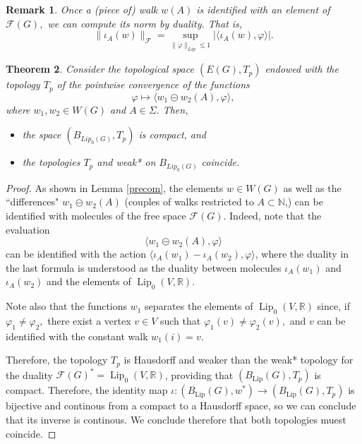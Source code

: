 \documentclass[preprint,12pt]{elsarticle}
\newtheorem{theorem}{Theorem}[section]
\newtheorem{remark}[theorem]{Remark}
\begin{document}
\begin{remark}
Once a (piece of) walk $w(A)$ is identified with an element of $\mathcal F(G),$ we can compute its norm by duality. That is, 
$$
\|\iota_A(w)\|_{\mathcal F} = \sup_{\|\varphi\|_{Lip}\le 1 } | \langle \iota_A(w), \varphi \rangle |.
$$
\end{remark}

\vspace{0.3cm}



\begin{theorem} \label{compact}
Consider the topological space $(E(G), T_p)$ endowed with the topology $T_p$ of the pointwise convergence of the functions
$$
\varphi \mapsto \langle w_1 \circleddash w_2(A), \varphi \rangle,
$$
where $w_1, w_2 \in W(G)$ and $A \in \Sigma.$ Then,
\begin{itemize}
\item[(i)] the space
 $(B_{Lip_0(G)}, T_p)$ is compact, and
\item[(ii)] the topologies
 $T_p$ and  weak* on $B_{Lip_0(G)}$ coincide.
\end{itemize}
\end{theorem}
\begin{proof}
As shown in Lemma \ref{precom}, the elements $w\in W(G)$ as well as the ``differences"
$w_1 \circleddash w_2(A)$ (couples of walks restricted to $A \subset \mathbb N$,) can be identified with molecules of the free space $\mathcal F(G).$ Indeed, note that the evaluation $$
\langle w_1 \circleddash w_2(A), \varphi \rangle 
$$
can be identified with the action $\langle \iota_A(w_1)- \iota_A(w_2),\varphi \rangle$, where the duality in the last formula is understood as the duality between molecules $\iota_A(w_1)$ and $\iota_A(w_2)$ and the elements of $\operatorname{Lip}_0(V,\mathbb R).$

Note also that the functions $w_1$ separates the elements of $\operatorname{Lip}_0(V,\mathbb R)$ since, if $\varphi_1 \ne \varphi_2,$ there exist a vertex $v\in V$ such that
$\varphi_1(v) \ne \varphi_2(v),$ and $v$ can be identified with the constant walk $w_1(i)=v.$ 

Therefore, the topology $T_p$ is Hausdorff and
weaker than the weak* topology for the duality $\mathcal F(G)^*=\operatorname{Lip}_0(V,\mathbb R)$, providing that $(B_{\operatorname{Lip}}(G), T_p)$ is compact. Therefore, the identity map $\iota\colon(B_{\operatorname{Lip}}(G), w^*)\to(B_{\operatorname{Lip}}(G), T_p)$ is bijective and continous from a compact to a Hausdorff space, so we can conclude that its inverse is continous. We conclude therefore that both topologies muest coincide.
\end{proof}
\end{document}
